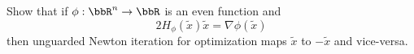 \documentclass[12pt, leqno]{article}
\begin{document}

Show that if $\phi : \bbR^n \rightarrow \bbR$ is an even function and
\[
  2 H_{\phi}(\tilde{x}) \tilde{x} = \nabla \phi(\tilde{x})
\]
then unguarded Newton iteration for optimization maps $\tilde{x}$ to
$-\tilde{x}$ and vice-versa.
\end{document}

